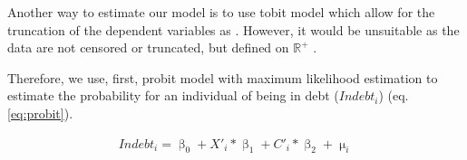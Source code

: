\documentclass[a4paper, 11pt, onecolumn]{article}
\begin{document}
Another way to estimate our model is to use tobit model which allow for the truncation of the dependent variables as \cite{Brown2014, Cox1993}.
However, it would be unsuitable as the data are not censored or truncated, but defined on $\mathbb{R}^{+}$ \citep{Maddala1991}.




Therefore, we use, first, probit model with maximum likelihood estimation to estimate the probability for an individual of being in debt ($Indebt_{i}$) (eq. \ref{eq:probit}).

\begin{equation}\label{eq:probit}
\begin{split}
Indebt_{i}=\upbeta_{0}+X'_{i}*\upbeta_{1}+C'_{i}*\upbeta_{2}+\upmu_{i}
\end{split}
\end{equation}
\end{document}
